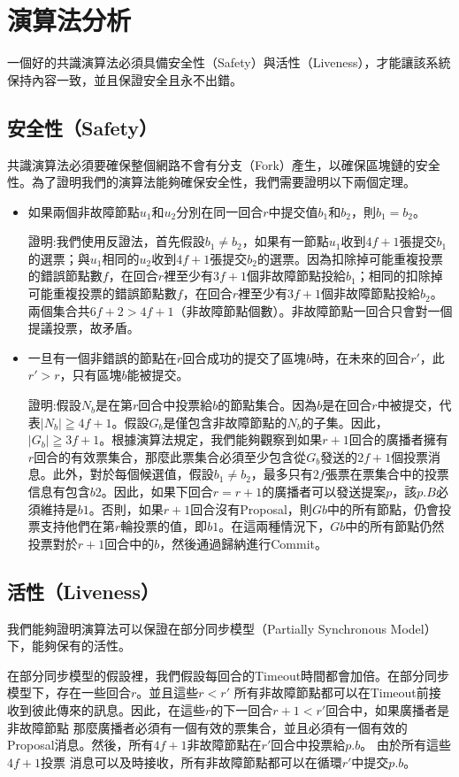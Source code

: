 \chapter{演算法分析}\label{se_4}
一個好的共識演算法必須具備安全性（Safety）與活性（Liveness），才能讓該系統保持內容一致，並且保證安全且永不出錯。
\section{安全性（Safety）}\label{se_4} 
共識演算法必須要確保整個網路不會有分支（Fork）產生，以確保區塊鏈的安全性。為了證明我們的演算法能夠確保安全性，我們需要證明以下兩個定理。
\begin{itemize}%
\item 如果兩個非故障節點$u_{1}$和$u_{2}$分別在同一回合$r$中提交值$b_{1}$和$b_{2}$，則$b_{1} = b_{2}$。

證明:我們使用反證法，首先假設$b_{1}\ne b_{2}$，如果有一節點$u_{1}$收到$4f+1$張提交$b_{1}$的選票；與$u_{1}$相同的$u_{2}$收到$4f+1$張提交$b_{2}$的選票。因為扣除掉可能重複投票的錯誤節點數$f$，在回合$r$裡至少有$3f+1$個非故障節點投給$b_{1}$；相同的扣除掉可能重複投票的錯誤節點數$f$，在回合$r$裡至少有$3f+1$個非故障節點投給$b_{2}$。兩個集合共$6f+2 > 4f+1$（非故障節點個數）。非故障節點一回合只會對一個提議投票，故矛盾。

\item 一旦有一個非錯誤的節點在$r$回合成功的提交了區塊$b$時，在未來的回合$r'$，此$r'>r$，只有區塊$b$能被提交。

證明:假設$N_{b}$是在第$r$回合中投票給$b$的節點集合。因為$b$是在回合$r$中被提交，代表$|N_{b}| \geqq 4f+1$。假設$G_{b}$是僅包含非故障節點的$N_{b}$的子集。因此，$|G_{b}| \geqq 3f+1$。根據演算法規定，我們能夠觀察到如果$r + 1$回合的廣播者擁有$r$回合的有效票集合，那麼此票集合必須至少包含從$G_{b}$發送的$2f + 1$個投票消息。此外，對於每個候選值，假設$b_{1}\ne b_{2}$，最多只有$2f$張票在票集合中的投票信息有包含$b2$。因此，如果下回合$r=r+1$的廣播者可以發送提案$p$，該$p.B$必須維持是$b1$。否則，如果$r+ 1$回合沒有Proposal，則$Gb$中的所有節點，仍會投票支持他們在第$r$輪投票的值，即$b1$。在這兩種情況下，$Gb$中的所有節點仍然投票對於$r+ 1$回合中的$b$，然後通過歸納進行Commit。
\end{itemize}

\section{活性（Liveness）}\label{se_4} 
我們能夠證明演算法可以保證在部分同步模型（Partially Synchronous Model）下，能夠保有的活性。

在部分同步模型的假設裡，我們假設每回合的Timeout時間都會加倍。在部分同步模型下，存在一些回合$r$。並且這些$r<r'$
所有非故障節點都可以在Timeout前接收到彼此傳來的訊息。因此，在這些$r$的下一回合$r + 1<r'$回合中，如果廣播者是非故障節點
那麼廣播者必須有一個有效的票集合，並且必須有一個有效的Proposal消息。然後，所有$4f +1$非故障節點在$r'$回合中投票給$p.b$。 由於所有這些$4f +1$投票
消息可以及時接收，所有非故障節點都可以在循環$r'$中提交$p.b$。
